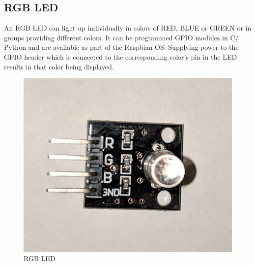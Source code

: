\documentclass[11pt,openright]{report}
\begin{document}
\subsection{RGB LED}
An RGB LED can light up individually in colors of RED, BLUE or GREEN or in groups providing different colors. It can be programmed GPIO modules in C/ Python and are available as part of the Raspbian OS. Supplying power to the GPIO header which is connected to the corresponding color’s pin in the LED results in that color being displayed.
\newline
\newline
\begin{figure}[!htbp]
    \centering
    \includegraphics[scale=0.1]{images/rgb_led.jpg}
    \caption{RGB LED}
    \label{fig:rgb_led}
\end{figure}
\newpage
\hfill\\
\end{document}
